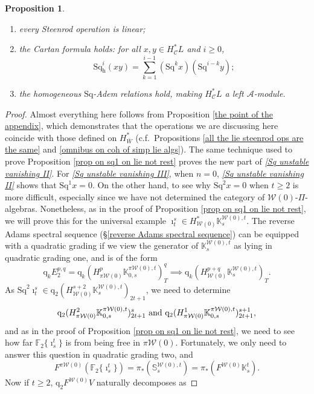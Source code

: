 \documentclass[11pt]{amsart} \renewcommand{\baselinestretch}{1.2}
\theoremstyle{plain}
\newtheorem{prop}[thm]{Proposition}
\numberwithin{equation}{section} %
\theoremstyle{plain}
\newtheorem{prop}[thm]{Proposition}
\numberwithin{equation}{chapter} %
\newcommand{\calA}{\mathcal{A}}
\newcommand{\calw}{\mathcal{W}}
\newcommand{\calc}{\mathcal{C}}
\newcommand{\PA}[1]{\pi#1}
\newcommand{\quadgrad}[1]{\mathrm{q}_{#1}}
\newcommand{\Sq}{\mathrm{Sq}}
\newcommand{\LieSteen}{\calA}
\newcommand{\F}{\mathbb{F}}
\newcommand{\Ftwo}{\F_2}
\newcommand{\dhor}{_\mathrm{h}}
\newcommand{\Sqh}{\mathrm{Sq}\dhor}
\begin{document}
\begin{Cohomology Operations for W and U}
\begin{prop}
\begin{enumerate}
\item every Steenrod operation is linear;
\item the \emph{Cartan formula} holds:  for all $x,y\in   H^*_{\calc}L$ and $i\geq0$,
\[\Sqh^i(xy)=\textstyle\sum_{k=1}^{i-1}(\Sq^kx)(\Sq^{i-k}y);\]
\item \label{yeah H is a Stmodule II} the  homogeneous $\Sq$-Adem relations hold, making $H^{*}_\calc L$ a left $\LieSteen$-module.
\end{enumerate}
\end{prop}
\begin{proof}
Almost everything here follows from Proposition \ref{the point of the appendix}, which demonstrates that the operations we are discussing here coincide with those defined on $H^*_{\bar{W}}$ (c.f.\ Propositions \ref{all the lie steenrod ops are the same} and \ref{omnibus on coh of simp lie algs}). The same technique used to prove Proposition \ref{prop on sq1 on lie not rest} proves the new part of \emph{\ref{Sq unstable vanishing II}}. For \emph{\ref{Sq unstable vanishing III}},  when $n=0$, \emph{\ref{Sq unstable vanishing II}} shows that $\Sq^1x=0$. On the other hand, to see why $\Sq^2x=0$ when $t\geq2$ is more difficult, especially since we have not determined the category of $\calw(0)$-$\Pi$-algebras. Nonetheless, as in the proof of Proposition \ref{prop on sq1 on lie not rest}, we will prove this for the universal example $\imath^s_t\in H^*_{\calw(0)}\mathbb{K}_s^{\calw(0),t}$. The reverse Adams spectral sequence (\S\ref{reverse Adams spectral sequence}) can be equipped with a quadratic grading if we view the generator of $\mathbb{K}_s^{\calw(0),t}$ as lying in quadratic grading one, and is of the form
\[\quadgrad{k}E_2^{p,q}=\quadgrad{k}(H^{p}_{\PA{\calw(0)}}\mathbb{K}_{0,s}^{\PA{\calw(0)},t})^{q}_{T}\implies \quadgrad{k}(H^{p+q}_{\calw(0)}\mathbb{K}_s^{\calw(0),t})_T.\]
As $\Sq^2\imath_t^s\in \quadgrad{2}(H^{s+2}_{\calw(0)}\mathbb{K}_s^{\calw(0),t})_{2t+1}$, we need to determine
\[
\quadgrad{2}(H^{2}_{\PA{\calw(0)}}\mathbb{K}_{0,s}^{\PA{\calw(0)},t})^{s}_{2t+1}\textup{ and }
\quadgrad{2}(H^{1}_{\PA{\calw(0)}}\mathbb{K}_{0,s}^{\PA{\calw(0)},t})^{s+1}_{2t+1},
\] 
and as in the proof of Proposition \ref{prop on sq1 on lie not rest}, we need to see how far $\Ftwo\{\imath^t_s\}$ is from being free in $\PA{\calw(0)}$. Fortunately, we only need to answer this question in quadratic grading two, and 
\[F^{\PA{\calw(0)}}(\Ftwo\{\imath^t_s\})=\pi_*(\mathbb{S}_s^{\calw(0),t})=\pi_*(F^{\calw(0)} \mathbb{K}^{t}_s).\]
Now if $t\geq2$, $\quadgrad{2}F^{\calw(0)}V$ naturally decomposes as 

\end{proof}
\end{Cohomology Operations for W and U}
\end{document}
